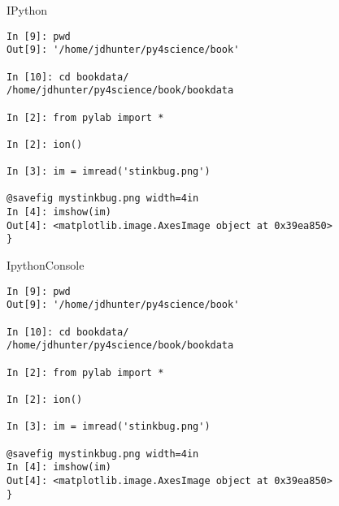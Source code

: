 \documentclass{article}
\begin{document}
IPython

\begin{verbatim}
In [9]: pwd
Out[9]: '/home/jdhunter/py4science/book'

In [10]: cd bookdata/
/home/jdhunter/py4science/book/bookdata

In [2]: from pylab import *

In [2]: ion()

In [3]: im = imread('stinkbug.png')

@savefig mystinkbug.png width=4in
In [4]: imshow(im)
Out[4]: <matplotlib.image.AxesImage object at 0x39ea850>
}
\end{verbatim}

IpythonConsole

\begin{verbatim}
In [9]: pwd
Out[9]: '/home/jdhunter/py4science/book'

In [10]: cd bookdata/
/home/jdhunter/py4science/book/bookdata

In [2]: from pylab import *

In [2]: ion()

In [3]: im = imread('stinkbug.png')

@savefig mystinkbug.png width=4in
In [4]: imshow(im)
Out[4]: <matplotlib.image.AxesImage object at 0x39ea850>
}
\end{verbatim}
\end{document}
